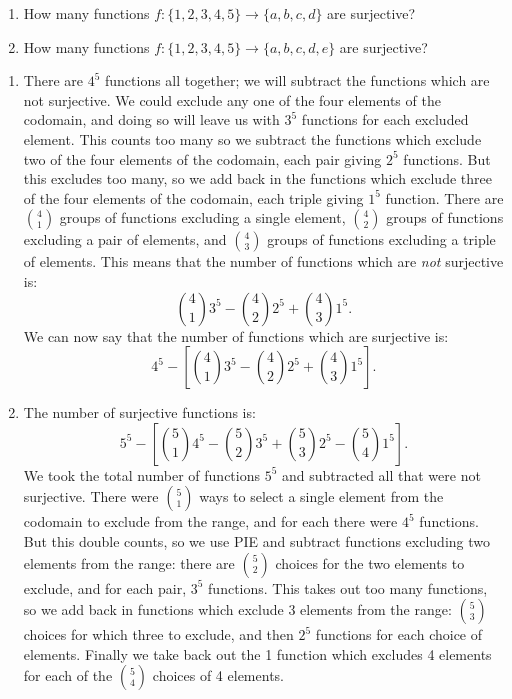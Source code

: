 \documentclass[12pt]{article}
\begin{document}
\begin{example}
  \begin{enumerate}
    \item How many functions $f: \{1,2,3,4,5\} \to \{a,b,c,d\}$ are surjective?
    \item How many functions $f: \{1,2,3,4,5\} \to \{a,b,c,d,e\}$ are surjective?
  \end{enumerate}
\begin{solution}
  \begin{enumerate}
    \item There are $4^5$ functions all together; we will subtract the functions which are not surjective.  We could exclude any one of the four elements of the codomain, and doing so will leave us with $3^5$ functions for each excluded element.  This counts too many so we subtract the functions which exclude two of the four elements of the codomain, each pair giving $2^5$ functions.  But this excludes too many, so we add back in the functions which exclude three of the four elements of the codomain, each triple giving $1^5$ function.  There are ${4 \choose 1}$ groups of functions excluding a single element, ${4 \choose 2}$ groups of functions excluding a pair of elements, and ${4 \choose 3}$ groups of functions excluding a triple of elements.  This means that the number of functions which are {\em not} surjective is:
    \[{4 \choose 1}3^5 - {4 \choose 2}2^5 + {4 \choose 3}1^5.\]
    We can now say that the number of functions which are surjective is:
    \[4^5 - \left[{4 \choose 1}3^5 - {4 \choose 2}2^5 + {4 \choose 3}1^5\right].\]

    \item The number of surjective functions is:
    \[5^5 - \left[{5 \choose 1}4^5 - {5 \choose 2}3^5 + {5 \choose 3}2^5 - {5 \choose 4}1^5\right].\]
    We took the total number of functions $5^5$ and subtracted all that were not surjective.  There were ${5 \choose 1}$ ways to select a single element from the codomain to exclude from the range, and for each there were $4^5$ functions.  But this double counts, so we use PIE and subtract functions excluding two elements from the range: there are ${5 \choose 2}$ choices for the two elements to exclude, and for each pair, $3^5$ functions.  This takes out too many functions, so we add back in functions which exclude 3 elements from the range: ${5 \choose 3}$ choices for which three to exclude, and then $2^5$ functions for each choice of elements.  Finally we take back out the 1 function which excludes 4 elements for each of the ${5 \choose 4}$ choices of 4 elements.
  \end{enumerate}

\end{solution}

\end{example}
\end{document}
